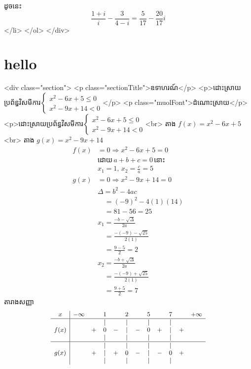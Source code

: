             ដូចនេះ $$\boxed{\dfrac{1+i}{i}-\dfrac{3}{4-i} = \dfrac{5}{17} - \dfrac{20}{17}i}$$
        </li>
    </ol>
</div>
\section{hello}
<div class="section">
    <p class="sectionTitle">ឧទាហរណ៍</p>
    <p>ដោះស្រាយប្រព័ន្ធវិសមីការ$\begin{cases}x^2-6x+5\le 0\\ x^2-9x+14\lt 0 \end{cases}$</p>
    <p class="muolFont">ដំណោះស្រាយ</p>
    <p>ដោះស្រាយប្រព័ន្ធវិសមីការ$\begin{cases}x^2-6x+5\le 0\\ x^2-9x+14\lt 0 \end{cases}$<br>
    តាង $f(x)=x^2-6x+5$ <br>
    តាង $g(x)=x^2-9x+14$
    $$\begin{aligned}
        f(x)&=0\Rightarrow x^2-6x+5=0\\
        &\text{ដោយ}\,a+b+c=0\,\text{នោះ}\\
        &x_1=1,\,x_2=\frac{c}{a}=5\\
        g(x)&=0\Rightarrow x^2-9x+14=0\\
        &\Delta=b^2-4ac\\
        &\quad=(-9)^2-4(1)(14)\\
        &\quad=81-56=25\\
        &x_1=\frac{-b-\sqrt{\Delta}}{2a}\\
        &\quad=\frac{-(-9)-\sqrt{25}}{2(1)}\\
        &\quad=\frac{9-5}{2}=2\\
        &x_2=\frac{-b+\sqrt{\Delta}}{2a}\\
        &\quad=\frac{-(-9)+\sqrt{25}}{2(1)}\\
        &\quad=\frac{9+5}{2}=7
    \end{aligned}$$
    តារាងសញ្ញា
    $$\small\begin{array}{c|lcccccccccr}
     x & -\infty & & 1 & & 2 & & 5 & & 7 & & +\infty \\\hline
       & & &\smash{\large\mid}& & \smash{\large\mid} & & \smash{\large\mid} & & \smash{\large\mid} & & \\
     f(x)& & + & 0 & - & \smash{\large\mid} & - & 0 & + & \smash{\large\mid} & + & \\
       & & &\smash{\large\mid}& & \smash{\large\mid} & & \smash{\large\mid} & & \smash{\large\mid} & & \\\hline
       & & &\smash{\large\mid}& & \smash{\large\mid} & & \smash{\large\mid} & & \smash{\large\mid} & & \\
    g(x)& & + &\smash{\large\mid}& + & 0 & - &\smash{\large\mid}&- &0& + & \\
         & & &\smash{\large\mid}& & \smash{\large\mid} & & \smash{\large\mid} & & \smash{\large\mid} & & \\
    \end{array}$$
